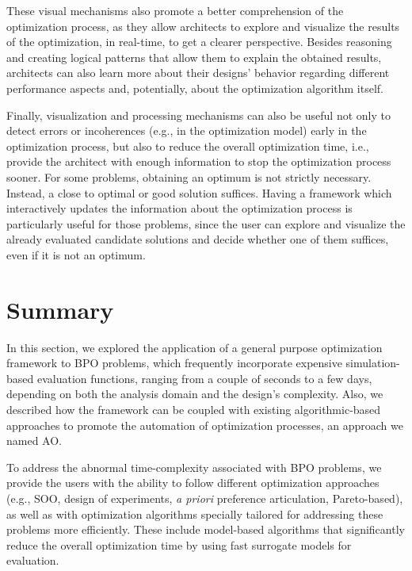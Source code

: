 These visual mechanisms also promote a better comprehension of the optimization process, as they allow architects to explore and visualize the results of the optimization, in real-time, to get a clearer perspective. Besides reasoning and creating logical patterns that allow them to explain the obtained results, architects can also learn more about their designs' behavior regarding different performance aspects and, potentially, about the optimization algorithm itself.

Finally, visualization and processing mechanisms can also be useful not only to detect errors or incoherences (e.g., in the optimization model) early in the optimization process, but also to reduce the overall optimization time, i.e.,  provide the architect with enough information to stop the optimization process sooner. For some problems, obtaining an optimum is not strictly necessary. Instead, a close to optimal or good solution suffices. Having a framework which interactively updates the information about the optimization process is particularly useful for those problems, since the user can explore and visualize the already evaluated candidate solutions and decide whether one of them suffices, even if it is not an optimum. 

\section{Summary}

In this section, we explored the application of a general purpose optimization framework to \ac{BPO} problems, which frequently incorporate expensive simulation-based evaluation functions, ranging from a couple of seconds to a few days, depending on both the analysis domain and the design's complexity. Also, we described how the framework can be coupled with existing algorithmic-based approaches to promote the automation of optimization processes, an approach we named \ac{AO}.

To address the abnormal time-complexity associated with \ac{BPO} problems, we provide the users with the ability to follow different optimization approaches (e.g., \ac{SOO}, design of experiments, \textit{a priori} preference articulation, Pareto-based), as well as with optimization algorithms specially tailored for addressing these problems more efficiently. These include model-based algorithms that significantly reduce the overall optimization time by using fast surrogate models for evaluation. %

